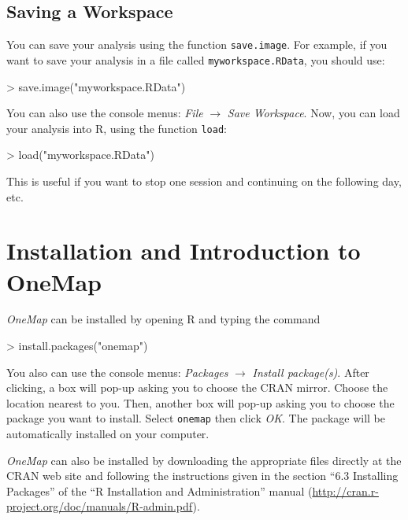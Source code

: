 \documentclass[letterpaper,12pt,oneside]{article}
\begin{document}
\subsection{Saving a Workspace}
\label{savework} 

You can save your analysis using the function {\tt save.image}. For example, if you want to save your analysis in a file called {\tt myworkspace.RData}, you should use:

\begin{Schunk}
\begin{Sinput}
> save.image("myworkspace.RData")
\end{Sinput}
\end{Schunk}

You can also use the console menus: {\it File} $ \rightarrow $ {\it Save Workspace}. Now, you can load your analysis into R, using the function {\tt load}:

\begin{Schunk}
\begin{Sinput}
> load("myworkspace.RData")
\end{Sinput}
\end{Schunk}

This is useful if you want to stop one session and continuing on the following day, etc.

\section{Installation and Introduction to OneMap}
\label{introonemap}
{\sl OneMap} can be installed by opening R and typing the command

\begin{Schunk}
\begin{Sinput}
> install.packages("onemap")
\end{Sinput}
\end{Schunk}

You also can use the console menus: {\it Packages} $ \rightarrow $ {\it Install package(s)}. After clicking, a box will pop-up asking you to choose the CRAN mirror. Choose the location nearest to you. Then, another box will pop-up asking you to choose the package you want to install. Select {\tt onemap} then click {\it OK}. The package will be automatically installed on your computer. 

{\sl OneMap} can also be installed by downloading the appropriate files directly at the CRAN web site and following the instructions given in the section ``6.3 Installing Packages'' of the ``R Installation and Administration'' manual (\url{http://cran.r-project.org/doc/manuals/R-admin.pdf}).
\end{document}
